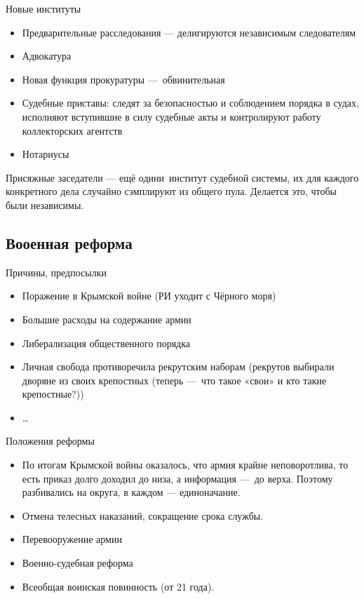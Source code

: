 \documentclass[12pt, a4paper]{article}
\begin{document}
Новые институты
\begin{itemize}
    \item Предварительные расследования — делигируются независимым следователям
    \item Адвокатура
    \item Новая функция прокуратуры — обвинительная
    \item Судебные приставы: следят за безопасностью и соблюдением порядка в судах, 
    исполняют вступившие в силу судебные акты и контролируют работу коллекторских агентств
    \item Нотариусы
\end{itemize}

Присяжные заседатели — ещё одини институт судебной системы, 
их для каждого конкретного дела случайно сэмплируют из общего пула.
Делается это, чтобы были независимы.


\subsection{Вооенная реформа}

Причины, предпосылки
\begin{itemize}
    \item Поражение в Крымской войне (РИ уходит с Чёрного моря)
    \item Большие расходы на содержание армии 
    \item Либерализация общественного порядка
    \item Личная свобода противоречила рекрутским наборам (рекрутов выбирали дворяне из своих крепостных (теперь — что такое «свои» и кто такие крепостные?))
    \item …
\end{itemize}

Положения реформы

\begin{itemize}
    \item По итогам Крымской войны оказалось, что армия крайне неповоротлива, то есть приказ долго доходил до низа, а информация — до верха.
    Поэтому разбивались на округа, в каждом — единоначание.
    \item Отмена телесных наказаний, сокращение срока службы.
    \item Перевооружение армии
    \item Военно-судебная реформа
    \item Всеобщая воинская повинность (от 21 года).
\end{itemize}
\end{document}

